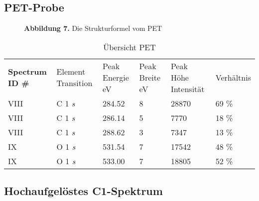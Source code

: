 \documentclass{article}
\begin{document}
\subsection{PET-Probe}

\begin{figure}

  \caption*{\textbf{Abbildung 7.} Die Strukturformel vom PET}
\end{figure}


\begin{table}[!htpb]
  \caption{Übersicht PET}
  \label{tab:pet}
  \begin{tabularx}{\textwidth}{XXXXXX}
    \textbf{Spectrum ID \#} & Element \newline Transition & Peak \newline
    Energie \si{\electronvolt} & Peak \newline Breite \si{\electronvolt}& Peak Höhe
    \newline Intensität & Verhältnis \\
    VIII    & C 1 \textit{s}& 284.52 & 8 & 28870 & 69 \% \\
    VIII    & C 1 \textit{s}& 286.14 & 5 & 7770  & 18 \% \\
    VIII    & C 1 \textit{s}& 288.62 & 3 & 7347  & 13 \%  \\
    IX      & O 1 \textit{s}& 531.54 & 7 & 17542 & 48 \%  \\
    IX      & O 1 \textit{s}& 533.00 & 7 & 18805 & 52 \%  \\
  \end{tabularx}
\end{table}


\subsection{Hochaufgelöstes C1-Spektrum }
\end{document}
